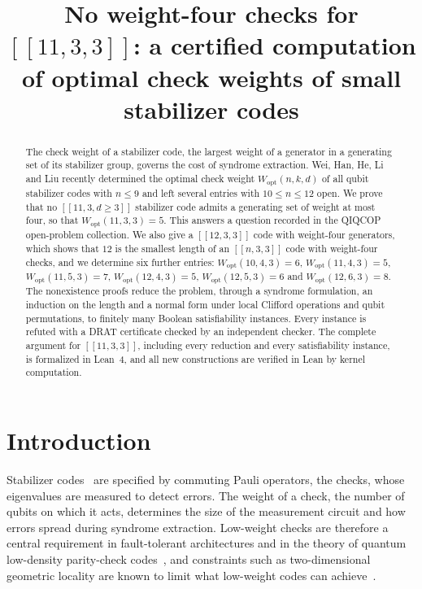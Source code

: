 \documentclass[a4paper,onecolumn,unpublished]{quantumarticle}
\theoremstyle{definition}
\theoremstyle{remark}
\newcommand{\Wopt}{W_{\mathrm{opt}}}
\newcommand{\qc}[1]{[\![#1]\!]}
\begin{document}
\title{No weight-four checks for $\qc{11,3,3}$: a certified computation of optimal check weights of small stabilizer codes}

\author{}
\author{}

\maketitle
{\renewcommand{\thefootnote}{\fnsymbol{footnote}}}

\begin{abstract}
The check weight of a stabilizer code, the largest weight of a generator in a generating set of
its stabilizer group, governs the cost of syndrome extraction. Wei, Han, He, Li and Liu recently
determined the optimal check weight $\Wopt(n,k,d)$ of all qubit stabilizer codes with $n\le9$ and
left several entries with $10\le n\le12$ open. We prove that no $\qc{11,3,d\ge3}$ stabilizer code
admits a generating set of weight at most four, so that $\Wopt(11,3,3)=5$. This answers a question
recorded in the QIQCOP open-problem collection. We also give a $\qc{12,3,3}$ code with
weight-four generators, which shows that $12$ is the smallest length of an $\qc{n,3,3}$ code with
weight-four checks, and we determine six further entries:
$\Wopt(10,4,3)=6$, $\Wopt(11,4,3)=5$, $\Wopt(11,5,3)=7$, $\Wopt(12,4,3)=5$, $\Wopt(12,5,3)=6$ and
$\Wopt(12,6,3)=8$. The nonexistence proofs reduce the problem, through a syndrome formulation,
an induction on the length and a normal form under local Clifford operations and qubit
permutations, to finitely many Boolean satisfiability instances. Every instance is refuted with a
DRAT certificate checked by an independent checker. The complete argument for $\qc{11,3,3}$,
including every reduction and every satisfiability instance, is formalized in Lean~4, and all
new constructions are verified in Lean by kernel computation.
\end{abstract}

\section{Introduction}

Stabilizer codes~\cite{Got97,CRSS98} are specified by commuting Pauli operators, the checks,
whose eigenvalues are measured to detect errors. The weight of a check, the number of qubits on
which it acts, determines the size of the measurement circuit and how errors spread during syndrome
extraction. Low-weight checks are therefore a central requirement in fault-tolerant architectures
and in the theory of quantum low-density parity-check codes~\cite{BE21}, and constraints
such as two-dimensional geometric locality are known to limit what low-weight codes can
achieve~\cite{BPT10}.
\end{document}
